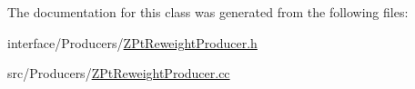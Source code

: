 The documentation for this class was generated from the following files:\begin{DoxyCompactItemize}
\item 
interface/Producers/\hyperlink{ZPtReweightProducer_8h}{ZPtReweightProducer.h}\item 
src/Producers/\hyperlink{ZPtReweightProducer_8cc}{ZPtReweightProducer.cc}\end{DoxyCompactItemize}
